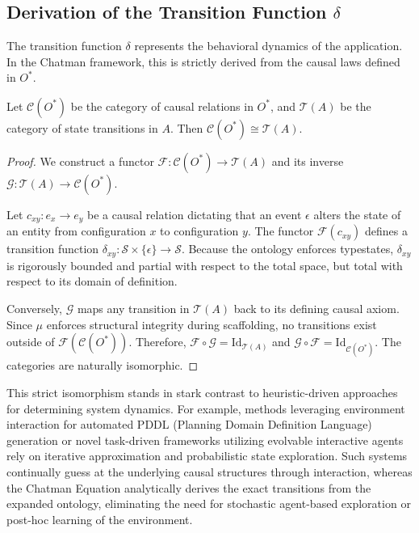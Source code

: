 \subsection{Derivation of the Transition Function $\delta$}

The transition function $\delta$ represents the behavioral dynamics of the application. In the Chatman framework, this is strictly derived from the causal laws defined in $O^*$.

\begin{lemma}
\label{lem:iso_transitions}
Let $\mathcal{C}(O^*)$ be the category of causal relations in $O^*$, and $\mathcal{T}(A)$ be the category of state transitions in $A$. Then $\mathcal{C}(O^*) \cong \mathcal{T}(A)$.
\end{lemma}

\begin{proof}
We construct a functor $\mathcal{F}: \mathcal{C}(O^*) \to \mathcal{T}(A)$ and its inverse $\mathcal{G}: \mathcal{T}(A) \to \mathcal{C}(O^*)$. 

Let $c_{xy}: e_x \to e_y$ be a causal relation dictating that an event $\epsilon$ alters the state of an entity from configuration $x$ to configuration $y$. The functor $\mathcal{F}(c_{xy})$ defines a transition function $\delta_{xy}: \mathcal{S} \times \{\epsilon\} \to \mathcal{S}$. Because the ontology enforces typestates, $\delta_{xy}$ is rigorously bounded and partial with respect to the total space, but total with respect to its domain of definition. 

Conversely, $\mathcal{G}$ maps any transition in $\mathcal{T}(A)$ back to its defining causal axiom. Since $\mu$ enforces structural integrity during scaffolding, no transitions exist outside of $\mathcal{F}(\mathcal{C}(O^*))$. Therefore, $\mathcal{F} \circ \mathcal{G} = \text{Id}_{\mathcal{T}(A)}$ and $\mathcal{G} \circ \mathcal{F} = \text{Id}_{\mathcal{C}(O^*)}$. The categories are naturally isomorphic.
\end{proof}

This strict isomorphism stands in stark contrast to heuristic-driven approaches for determining system dynamics. For example, methods leveraging environment interaction for automated PDDL (Planning Domain Definition Language) generation \cite{ref_LeveragingEnvir21} or novel task-driven frameworks utilizing evolvable interactive agents \cite{ref_ANovelTaskDrive20} rely on iterative approximation and probabilistic state exploration. Such systems continually guess at the underlying causal structures through interaction, whereas the Chatman Equation analytically derives the exact transitions from the expanded ontology, eliminating the need for stochastic agent-based exploration or post-hoc learning of the environment.

